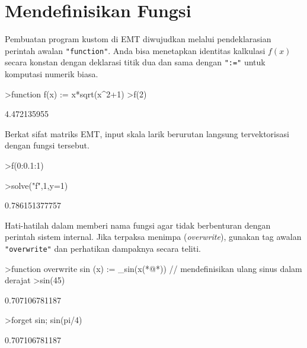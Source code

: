 \documentclass[a4paper,11pt,oneside,enabledeprecatedfontcommands]{scrbook}
\newenvironment{eulernotebook}{}{}
\newcommand{\eulerheading}[1]{\chapter{#1}}
\newenvironment{eulercomment}{\par\medskip\noindent}{\par\medskip}
\begin{document}
\begin{eulernotebook}
\eulerheading{Mendefinisikan Fungsi}
\begin{eulercomment}
Pembuatan program kustom di EMT diwujudkan melalui pendeklarasian perintah awalan \texttt{"function"}. Anda bisa menetapkan identitas kalkulasi $f(x)$ secara konstan dengan deklarasi titik dua dan sama dengan \texttt{":="} untuk komputasi numerik biasa.
\end{eulercomment}
\begin{eulerprompt}
>function f(x) := x*sqrt(x^2+1)
>f(2)
\end{eulerprompt}
\begin{euleroutput}
4.472135955
\end{euleroutput}
\begin{eulercomment}
Berkat sifat matriks EMT, input skala larik berurutan langsung tervektorisasi dengan fungsi tersebut.
\end{eulercomment}
\begin{eulerprompt}
>f(0:0.1:1)
\end{eulerprompt}
\begin{euleroutput}
[0,  0.100499,  0.203961,  0.313209,  0.430813,  0.559017,  0.699714,  0.854459,  1.0245,  1.21083,
1.41421]
\end{euleroutput}
\begin{eulerprompt}
>solve("f",1,y=1)
\end{eulerprompt}
\begin{euleroutput}
0.786151377757
\end{euleroutput}
\begin{eulercomment}
Hati-hatilah dalam memberi nama fungsi agar tidak berbenturan dengan perintah sistem internal. Jika terpaksa menimpa (\emph{overwrite}), gunakan tag awalan \texttt{"overwrite"} dan perhatikan dampaknya secara teliti.
\end{eulercomment}
\begin{eulerprompt}
>function overwrite sin (x) := _sin(x(*@\textdegree@*)) // mendefinisikan ulang sinus dalam derajat
>sin(45)
\end{eulerprompt}
\begin{euleroutput}
0.707106781187
\end{euleroutput}
\begin{eulerprompt}
>forget sin; sin(pi/4)
\end{eulerprompt}
\begin{euleroutput}
0.707106781187
\end{euleroutput}


\end{eulernotebook}
\end{document}
